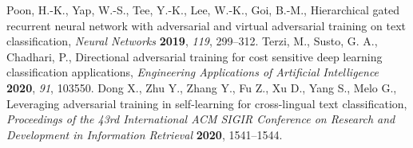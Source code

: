 \documentclass[symmetry,article,submit,moreauthors,pdftex]{Definitions/mdpi}
\begin{document}
\begin{thebibliography}{999}
Poon, H.-K.,  Yap, W.-S., Tee, Y.-K.,   Lee, W.-K., Goi, B.-M., Hierarchical gated recurrent neural network with adversarial and virtual adversarial training on text classification, {\em Neural Networks} {\bf 2019}, {\em 119},  299--312.
Terzi, M., Susto, G. A., Chadhari, P., Directional adversarial training for cost sensitive deep learning classification applications, {\em Engineering Applications of Artificial Intelligence} {\bf 2020}, {\em 91}, 103550.
Dong X., Zhu Y., Zhang Y., Fu Z., Xu D., Yang S., Melo G., Leveraging adversarial training in self-learning for cross-lingual text classification, {\em Proceedings of the 43rd International ACM SIGIR Conference on Research and Development in Information Retrieval} {\bf 2020}, 1541--1544.


\end{thebibliography}
\end{document}

